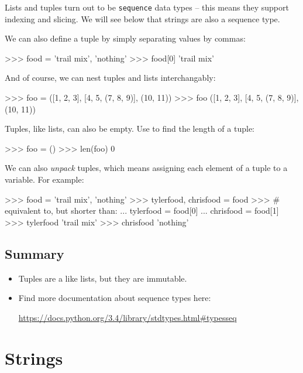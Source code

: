 \documentclass[11pt]{cselabheader}
\begin{document}
Lists and tuples turn out to be \texttt{sequence} data types -- this means they
support indexing and slicing. We will see below that strings are also a sequence
type.

We can also define a tuple by simply separating values by commas:

\begin{pyconcode}
>>> food = 'trail mix', 'nothing'
>>> food[0]
'trail mix'
\end{pyconcode}

And of course, we can nest tuples and lists interchangably:

\begin{pyconcode}
>>> foo = ([1, 2, 3], [4, 5, (7, 8, 9)], (10, 11))
>>> foo
([1, 2, 3], [4, 5, (7, 8, 9)], (10, 11))
\end{pyconcode}

Tuples, like lists, can also be empty. Use  to find the
length of a tuple:

\begin{pyconcode}
>>> foo = ()
>>> len(foo)
0
\end{pyconcode}

We can also \emph{unpack} tuples, which means assigning each element of a tuple
to a variable. For example:

\begin{pyconcode}
>>> food = 'trail mix', 'nothing'
>>> tylerfood, chrisfood = food
>>> # equivalent to, but shorter than:
... tylerfood = food[0]
... chrisfood = food[1]
>>> tylerfood
'trail mix'
>>> chrisfood
'nothing'
\end{pyconcode}

\subsection{Summary}

\begin{itemize}
  \item Tuples are a like lists, but they are immutable.

  \item Find more documentation about sequence types here:

    \begin{center}
      \url{https://docs.python.org/3.4/library/stdtypes.html#typesseq}
    \end{center}
\end{itemize}

\pagebreak
\section{Strings}
\end{document}
